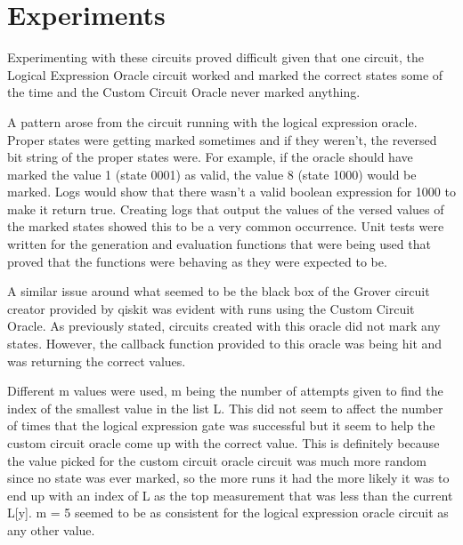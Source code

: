 \documentclass[11pt]{article}
\begin{document}
\newpage

\section{Experiments}

Experimenting with these circuits proved difficult given that one circuit, the Logical Expression Oracle circuit worked and marked the correct states some of the time and the Custom Circuit Oracle never marked anything.

A pattern arose from the circuit running with the logical expression oracle. Proper states were getting marked sometimes and if they weren't, the reversed bit string of the proper states were. For example, if the oracle should have marked the value 1 (state 0001) as valid, the value 8 (state 1000) would be marked. Logs would show that there wasn't a valid boolean expression for 1000 to make it return true. Creating logs that output the values of the versed values of the marked states showed this to be a very common occurrence. Unit tests were written for the generation and evaluation functions that were being used that proved that the functions were behaving as they were expected to be.


A similar issue around what seemed to be the black box of the Grover circuit creator provided by qiskit was evident with runs using the Custom Circuit Oracle. As previously stated, circuits created with this oracle did not mark any states. However, the callback function provided to this oracle was being hit and was returning the correct values.


Different m values were used, m being the number of attempts given to find the index of the smallest value in the list L. This did not seem to affect the number of times that the logical expression gate was successful but it seem to help the custom circuit oracle come up with the correct value. This is definitely because the value picked for the custom circuit oracle circuit was much more random since no state was ever marked, so the more runs it had the more likely it was to end up with an index of L as the top measurement that was less than the current L[y]. m = 5 seemed to be as consistent for the logical expression oracle circuit as any other value.
\end{document}

